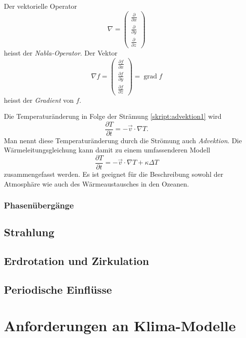 \begin{definition}
Der vektorielle Operator 
\[
\nabla
=
\begin{pmatrix}
\frac{\partial}{\partial x}\\
\frac{\partial}{\partial y}\\
\frac{\partial}{\partial z}
\end{pmatrix}
\]
heisst der {\em Nabla-Operator}.
Der Vektor
\[
\nabla f
=
\begin{pmatrix}
\frac{\partial f}{\partial x}\\
\frac{\partial f}{\partial y}\\
\frac{\partial f}{\partial z}
\end{pmatrix}
=
\operatorname{grad} f
\]
heisst der {\em Gradient} von $f$.
\end{definition}
%
%

Die Temperaturänderung in Folge der Strämung 
\eqref{skript:advektion1}
wird 
\begin{equation}
\frac{\partial T}{\partial t}
=
-\vec{v}\cdot\nabla T.
\label{skript:advektion2}
\end{equation}
%
Man nennt diese Temperaturänderung durch die Strömung auch
{\em Advektion}.
Die Wärmeleitungsgleichung kann damit zu einem umfassenderen
Modell
\begin{equation}
\frac{\partial T}{\partial t}
=
-\vec{v}\cdot\nabla T +\kappa\Delta T
\label{skript:waermeleitungadvektion}
\end{equation}
zusammengefasst werden.
Es ist geeignet für die Beschreibung sowohl der Atmosphäre wie auch des
Wärmeaustausches in den Ozeanen.

\subsubsection{Phasenübergänge}

\subsection{Strahlung}

\subsection{Erdrotation und Zirkulation}

\subsection{Periodische Einflüsse}

\section{Anforderungen an Klima-Modelle}



